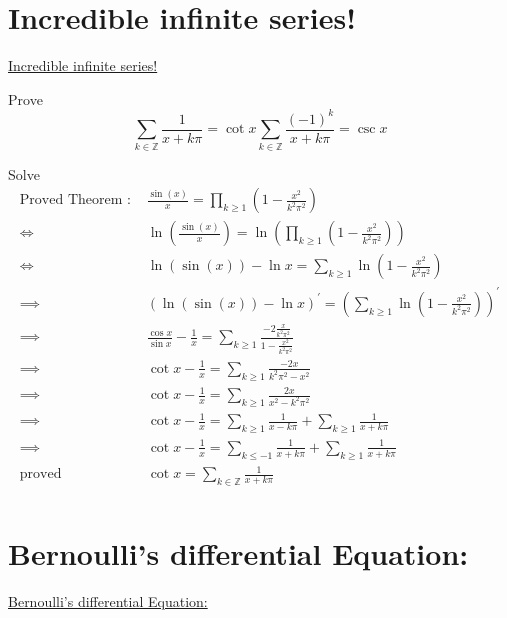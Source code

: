 \documentclass {article}
\begin{document}
\section{Incredible infinite series!}
\href{https://www.youtube.com/watch?v=mL3ftmldMow}{Incredible infinite series!}

Prove \[
  \displaystyle\sum_{k \in \mathbb{Z}} \frac{1}{x + k\pi} = \cot x
  \displaystyle\sum_{k \in \mathbb{Z}} \frac{(-1)^k}{x + k\pi} = \csc x
\]


Solve 
\[
\begin{matrix}
  \text{Proved Theorem :  } & \frac{\sin(x)} {x} = \displaystyle\prod_{k \ge 1} \left(1 - \frac{x^2}{k^2\pi^2}\right) \\
\Longleftrightarrow  & \ln\left( \frac{\sin(x)} {x} \right) = \ln\left(\displaystyle\prod_{k \ge 1} \left(1 - \frac{x^2}{k^2\pi^2}\right) \right) \\
\Longleftrightarrow & \ln(\sin(x)) - \ln x = \displaystyle\sum_{k \ge 1} \ln\left(1 - \frac{x^2}{k^2\pi^2}\right) \\
\implies & \left(\ln(\sin(x)) - \ln x \right)^{'} = \left(\displaystyle\sum_{k \ge 1} \ln\left(1 - \frac{x^2}{k^2\pi^2}\right)\right)^{'} \\
\implies & \frac{\cos x}{\sin x} - \frac{1}{x} = \displaystyle\sum_{k \ge 1} \frac{-2 \frac{x}{k^2\pi^2}} { 1 - \frac{x^2}{k^2\pi^2}} \\
\implies & \cot x - \frac{1}{x} = \displaystyle\sum_{k \ge 1} \frac{-2x}{k^2\pi^2 - x^2} \\
\implies & \cot x - \frac{1}{x} = \displaystyle\sum_{k \ge 1} \frac{2x}{  x^2 - k^2\pi^2} \\
\implies & \cot x - \frac{1}{x} = \displaystyle\sum_{k \ge 1} \frac{1}{  x - k\pi}  + \displaystyle\sum_{k \ge 1} \frac{1}{  x + k\pi} \\
\implies & \cot x - \frac{1}{x} = \displaystyle\sum_{k \le -1} \frac{1}{  x + k\pi}  + \displaystyle\sum_{k \ge 1} \frac{1}{  x + k\pi} \\
\text{proved  } & \cot x = \displaystyle\sum_{k \in \mathbb{Z}} \frac{1}{x + k\pi} \\

\end{matrix}
\]


\section{Bernoulli's differential Equation: }
\href{https://www.youtube.com/watch?v=r_nP-4GSGEc}{Bernoulli's differential Equation: }
\end{document}
